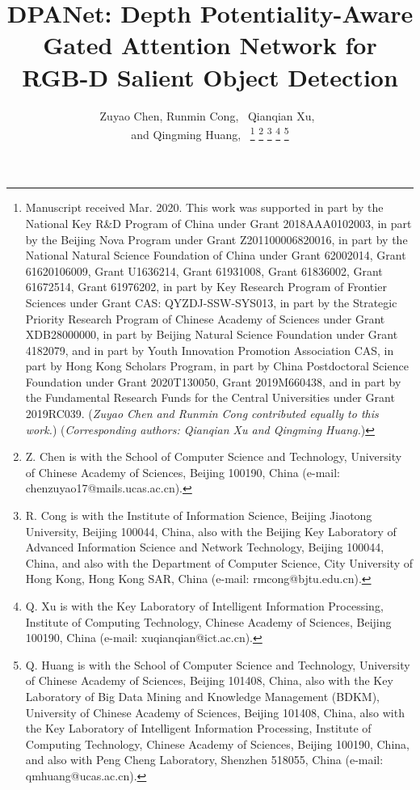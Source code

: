 \documentclass[journal]{IEEEtran}
\begin{document}
\title{DPANet: Depth Potentiality-Aware Gated Attention Network for RGB-D Salient Object Detection}

\author{Zuyao Chen, Runmin Cong,~ Qianqian Xu,~\\ and Qingming Huang,~
\thanks{Manuscript received Mar. 2020. This work was supported in part by the National Key R\&D Program of China under Grant 2018AAA0102003, in part by the Beijing Nova Program under Grant Z201100006820016, in part by the National Natural Science Foundation of China under Grant 62002014, Grant 61620106009, Grant U1636214, Grant 61931008, Grant 61836002, Grant 61672514, Grant 61976202, in part by Key Research Program of Frontier Sciences under Grant CAS: QYZDJ-SSW-SYS013, in part by the Strategic Priority Research Program of Chinese Academy of Sciences under Grant XDB28000000, in part by Beijing Natural Science Foundation under Grant 4182079, and in part by Youth Innovation Promotion Association CAS, in part by Hong Kong Scholars Program, in part by China Postdoctoral Science Foundation under Grant 2020T130050, Grant 2019M660438, and in part by the Fundamental Research Funds for the Central Universities under Grant 2019RC039.  (\emph{Zuyao Chen and Runmin Cong contributed equally to this work.}) (\emph{Corresponding authors: Qianqian Xu and Qingming Huang.})
}
\thanks{Z. Chen is with the School of Computer Science and Technology, University of Chinese Academy of Sciences, Beijing 100190, China (e-mail: chenzuyao17@mails.ucas.ac.cn).}
\thanks{R. Cong is with the Institute of Information Science, Beijing Jiaotong University, Beijing 100044, China, also with the Beijing Key Laboratory of Advanced Information Science and Network Technology, Beijing 100044, China, and also with the Department of Computer Science, City University of Hong Kong, Hong Kong SAR, China (e-mail: rmcong@bjtu.edu.cn).}
\thanks{Q. Xu is with the Key Laboratory of Intelligent Information Processing, Institute of Computing Technology, Chinese Academy of Sciences, Beijing 100190, China (e-mail: xuqianqian@ict.ac.cn).}
\thanks{Q. Huang is with the School of Computer Science and Technology, University of Chinese Academy of Sciences, Beijing 101408, China, also with the Key Laboratory of Big Data Mining and Knowledge Management (BDKM), University of Chinese Academy of Sciences, Beijing 101408, China, also with the Key Laboratory of Intelligent Information Processing, Institute of Computing Technology, Chinese Academy of Sciences, Beijing 100190, China, and also with Peng Cheng Laboratory, Shenzhen 518055, China (e-mail: qmhuang@ucas.ac.cn).}
}
\end{document}
